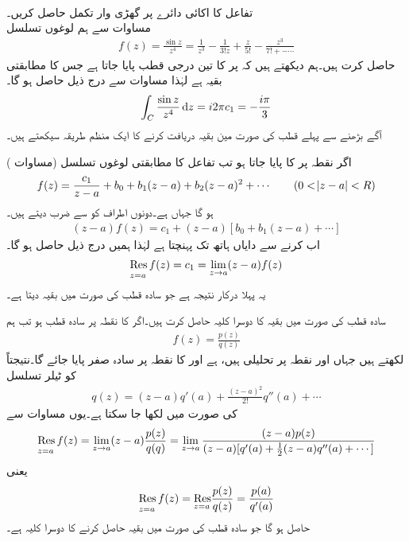 \quad {}\\
تفاعل  کا اکائی دائرے پر گھڑی وار تکمل حاصل کریں۔\\
مساوات  سے ہم لوغوں تسلسل
\begin{align*}
f(z)=\frac{\sin z}{z^4}=\frac{1}{z^3}-\frac{1}{3!z}+\frac{z}{5!}-\frac{z^3}{7!+-\cdots}
\end{align*}
حاصل کرت ہیں۔ہم دیکھتے ہیں کہ  پر  کا تین درجی قطب پایا جاتا ہے جس کا مطابقتی بقیہ  ہے لہٰذا مساوات  سے درج ذیل حاصل ہو گا۔
\begin{align*}
\int_C \frac{\sin z}{z^4}\dif z=i2\pi c_1=-\frac{i\pi}{3}
\end{align*}
آگے بڑھنے سے پہلے قطب کی صورت مین بقیہ دریافت کرنے کا ایک منظم طریقہ سیکھتے ہیں۔

اگر نقطہ  پر  کا  پایا جاتا ہو تب تفاعل کا مطابقتی لوغوں تسلسل (مساوات ) 
\begin{align*}
f(z)=\frac{c_1}{z-a}+b_0+b_1(z-a)+b_2(z-a)^2+\cdots\quad \quad (0<\abs{z-a}<R)
\end{align*}
ہو گا جہاں  ہے۔دونوں اطراف کو  سے ضرب دیتے ہیں۔
\begin{align}
(z-a)f(z)=c_1+(z-a)[b_0+b_1(z-a)+\cdots]
\end{align}
اب  کرنے سے دایاں ہاتھ  تک پہنچتا ہے لہٰذا ہمیں درج ذیل حاصل ہو گا۔
\begin{align}\label{مساوات_بقیہ_پہلا_کلیہ}
\underset{z=a\hfill}{\Res f(z)}=c_1=\lim_{z\to a} (z-a)f(z)
\end{align}  
یہ پہلا درکار نتیجہ ہے جو سادہ قطب کی صورت میں بقیہ دیتا ہے۔

سادہ قطب کی صورت میں بقیہ کا دوسرا کلیہ حاصل کرت ہیں۔اگر  کا نقطہ  پر سادہ قطب ہو تب ہم
\begin{align*}
 f(z)=\tfrac{p(z)}{q(z)}
\end{align*}
 لکھتے ہیں جہاں  اور  نقطہ  پر تحلیلی ہیں،  ہے اور  کا نقطہ  پر سادہ صفر پایا جائے گا۔نتیجتاً  کو ٹیلر تسلسل
\begin{align*}
q(z)=(z-a)q'(a)+\frac{(z-a)^2}{2!}q''(a)+\cdots
\end{align*}
کی صورت میں لکھا جا سکتا ہے۔یوں مساوات   سے 
\begin{align*}
\underset{z=a\hfill}{\Res f(z)}=\lim_{z\to a} (z-a)\frac{p(z)}{q(q)}=\lim_{z\to a}\frac{(z-a)p(z)}{(z-a)[q'(a)+\tfrac{1}{2}(z-a)q''(a)+\cdots]}
\end{align*}
یعنی 
\begin{align}\label{مساوات_بقیہ_دوسرا_کلیہ}
\underset{z=a\hfill}{\Res f(z)}=\underset{z=a\hfill}{\Res} \frac{p(z)}{q(z)}=\frac{p(a)}{q'(a)}
\end{align}
حاصل ہو گا جو سادہ قطب کی صورت میں بقیہ حاصل کرنے کا دوسرا کلیہ ہے۔

